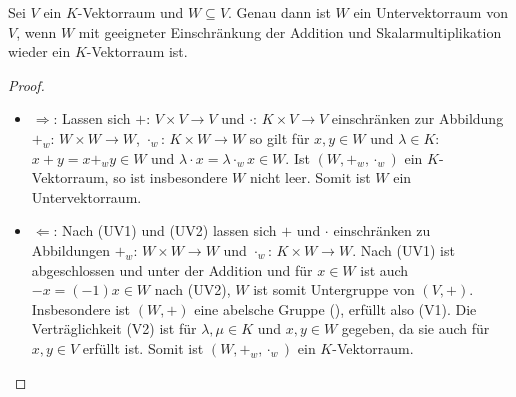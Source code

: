 \begin{proposition}
	Sei $V$ ein $K$-Vektorraum und $W \subseteq V$. Genau dann ist $W$ ein Untervektorraum von $V$, wenn $W$ mit geeigneter
	Einschränkung der Addition und Skalarmultiplikation wieder ein $K$-Vektorraum ist.
\end{proposition}
\begin{proof}
	\begin{itemize}
		\item $\Rightarrow$: Lassen sich $+$: $V \times V \to V$ und $\cdot$: $K \times V \to V$ einschränken zur Abbildung $+_w$: $W
		\times W \to W$, $\cdot_w$: $K \times W \to W$ so gilt für $x,y \in W$ und $\lambda \in K$: $x+y=x +_w y \in W$ und
		$\lambda\cdot x=\lambda \cdot_w x \in W$. Ist $(W,+_w,\cdot_w)$ ein $K$-Vektorraum, so ist insbesondere $W$ nicht leer. Somit
		ist $W$ ein Untervektorraum.
		\item $\Leftarrow$: Nach (UV1) und (UV2) lassen sich $+$ und $\cdot$ einschränken zu Abbildungen $+_w$: $W \times W \to W$ und 
		$\cdot_w$: $K \times W \to W$. Nach (UV1) ist abgeschlossen und unter der Addition und für $x \in W$ ist auch $-x=
		(-1)x \in W$ nach (UV2), $W$ ist somit Untergruppe von $(V,+)$. Insbesondere ist $(W,+)$ eine abelsche Gruppe (), erfüllt 
		also (V1). Die Verträglichkeit (V2) ist für $\lambda,\mu \in K$ und $x,y \in W$ gegeben, da sie auch für $x,y \in V$ 
		erfüllt ist. Somit ist $(W,+_w,\cdot_w)$ ein $K$-Vektorraum.
	\end{itemize}
\end{proof}

